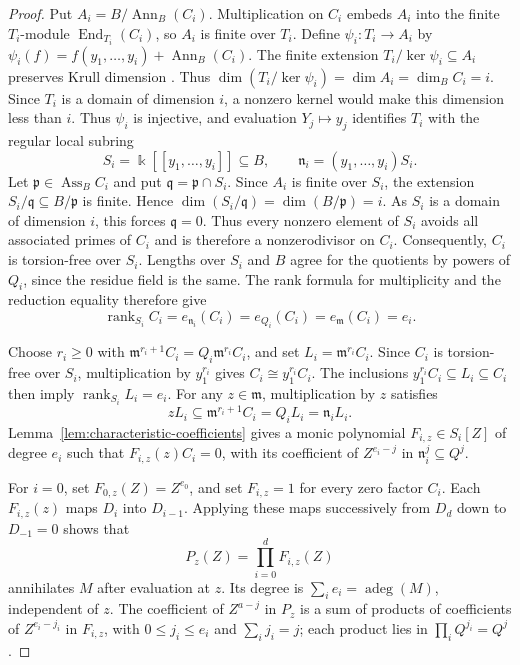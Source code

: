\documentclass[11pt,reqno]{amsart}
\numberwithin{equation}{section}
\theoremstyle{definition}
\newcommand{\m}{\mathfrak m}
\newcommand{\adeg}{\operatorname{adeg}}
\newcommand{\Ann}{\operatorname{Ann}}
\newcommand{\Ass}{\operatorname{Ass}}
\begin{document}
\begin{proof}
Put $A_i=B/\Ann_B(C_i)$. Multiplication on $C_i$ embeds $A_i$
into the finite $T_i$-module $\operatorname{End}_{T_i}(C_i)$,
so $A_i$ is finite over $T_i$. Define $\psi_i:T_i\to A_i$ by
$\psi_i(f)=f(y_1,\ldots,y_i)+\Ann_B(C_i)$.
The finite extension $T_i/\ker\psi_i\subseteq A_i$ preserves Krull
dimension \cite[Section~8.1, Axiom~D3]{Eisenbud1995}.
Thus $\dim(T_i/\ker\psi_i)=\dim A_i=\dim_B C_i=i$.
Since $T_i$ is a domain of dimension $i$, a nonzero kernel would
make this dimension less than $i$. Thus $\psi_i$ is injective,
and evaluation $Y_j\mapsto y_j$ identifies $T_i$ with the
regular local subring
\[
 S_i=\Bbbk[[y_1,\ldots,y_i]]\subseteq B,
 \qquad \mathfrak n_i=(y_1,\ldots,y_i)S_i.
\]
Let $\mathfrak p\in\Ass_B C_i$ and put
$\mathfrak q=\mathfrak p\cap S_i$. Since $A_i$ is finite over
$S_i$, the extension $S_i/\mathfrak q\subseteq B/\mathfrak p$
is finite. Hence
$\dim(S_i/\mathfrak q)=\dim(B/\mathfrak p)=i$.
As $S_i$ is a domain of dimension $i$, this forces
$\mathfrak q=0$. Thus every nonzero element of $S_i$ avoids
all associated primes of $C_i$ and is therefore a
nonzerodivisor on $C_i$. Consequently, $C_i$ is torsion-free
over $S_i$.
Lengths over $S_i$ and $B$ agree for the quotients by powers of
$Q_i$, since the residue field is the same. The rank formula for
multiplicity and the reduction equality therefore give
\[
 \operatorname{rank}_{S_i}C_i
 =e_{\mathfrak n_i}(C_i)=e_{Q_i}(C_i)=e_{\m}(C_i)=e_i.
\]

Choose $r_i\ge0$ with
$\m^{r_i+1}C_i=Q_i\m^{r_i}C_i$, and set $L_i=\m^{r_i}C_i$.
Since $C_i$ is torsion-free over $S_i$, multiplication by
$y_1^{r_i}$ gives $C_i\cong y_1^{r_i}C_i$. The inclusions
$y_1^{r_i}C_i\subseteq L_i\subseteq C_i$ then imply
$\operatorname{rank}_{S_i}L_i=e_i$.
For any $z\in\m$, multiplication by $z$ satisfies
\[
 zL_i\subseteq\m^{r_i+1}C_i=Q_iL_i=\mathfrak n_iL_i.
\]
Lemma~\ref{lem:characteristic-coefficients} gives a monic polynomial
$F_{i,z}\in S_i[Z]$ of degree $e_i$ such that
$F_{i,z}(z)C_i=0$, with its coefficient of $Z^{e_i-j}$ in
$\mathfrak n_i^j\subseteq Q^j$.

For $i=0$, set $F_{0,z}(Z)=Z^{e_0}$, and set $F_{i,z}=1$ for
every zero factor $C_i$. Each $F_{i,z}(z)$ maps $D_i$ into
$D_{i-1}$. Applying these maps successively from $D_d$ down to
$D_{-1}=0$ shows that
\[
 P_z(Z)=\prod_{i=0}^d F_{i,z}(Z)
\]
annihilates $M$ after evaluation at $z$.
Its degree is $\sum_i e_i=\adeg(M)$, independent of $z$.
The coefficient of $Z^{a-j}$ in $P_z$ is a sum of products
of coefficients of $Z^{e_i-j_i}$ in $F_{i,z}$, with
$0\le j_i\le e_i$ and $\sum_i j_i=j$; each product
lies in $\prod_i Q^{j_i}=Q^j$.
\end{proof}
\end{document}
